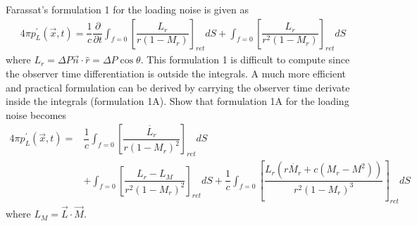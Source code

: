 \documentclass[onecolumn,10pt]{jhwhw}
\begin{document}
\problem{[50 points]}
Farassat’s formulation 1 for the loading noise is given as
\begin{align*}
4 \pi p_L^{\prime}(\vec{x}, t) = \dfrac{1}{c} \dfrac{\partial}{\partial t}
\int_{f=0} \left[ \dfrac{L_r}{r(1-M_r)} \right]_{ret} dS + \int_{f=0} \left[ \dfrac{L_r}{r^2(1-M_r)} \right]_{ret} dS
\end{align*}
where $L_r = \Delta P \vec{n} \cdot \hat{r} = \Delta P \cos \theta$. This formulation 1 is difficult to compute since the observer time differentiation is outside the integrals. A much more efficient and practical formulation can be derived by carrying the observer time derivate inside the integrals (formulation 1A). Show that formulation 1A for the loading noise becomes
\begin{align*}
4 \pi p_L^{\prime}(\vec{x}, t) =& \dfrac{1}{c} \int_{f=0} \left[ \dfrac{\dot{L_r}}{r(1-M_r)^2} \right]_{ret} dS \\
&+ \int_{f=0} \left[ \dfrac{L_r-L_M}{r^2(1-M_r)^2} \right]_{ret} dS
+ \dfrac{1}{c} \int_{f=0} \left[ \dfrac{L_r (r \dot{M_r} + c(M_r-M^2))}{r^2(1-M_r)^3} \right]_{ret} dS
\end{align*}
where $L_M = \vec{L} \cdot \vec{M}$.
\end{document}
